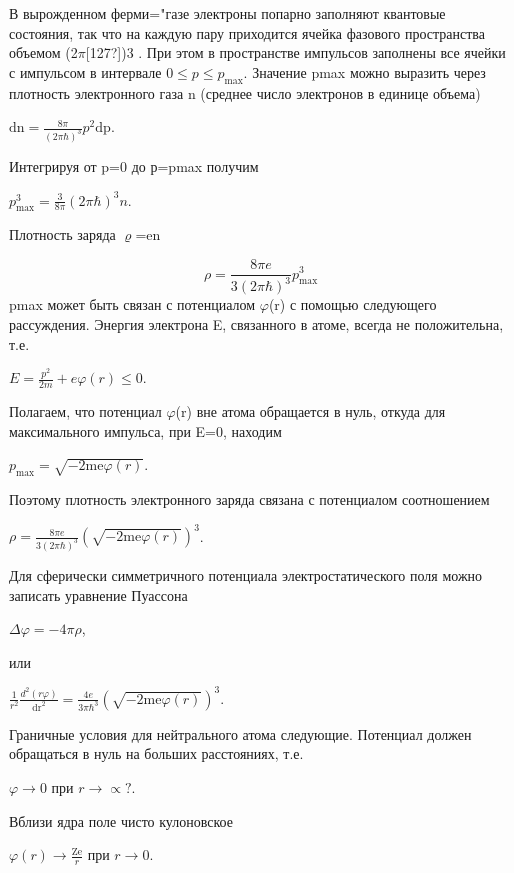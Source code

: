 \documentclass[a4paper,14pt, openany, twoside, draft]{extbook} %
\begin{document}
В вырожденном ферми="газе электроны попарно заполняют квантовые состояния, так что на каждую пару приходится ячейка фазового пространства объемом (2${\pi}$\textlatin{[127?]})3 . При этом в пространстве импульсов заполнены все ячейки с импульсом в интервале  $0\le p\le p_{\text{max}}$. Значение pmax можно выразить через плотность электронного газа n (среднее число электронов в единице объема)

 ${\text{dn}}=\frac{8\pi }{(2\pi \hbar )^3}p^2{\text{dp}}$.

Интегрируя от p=0 до р=pmax получим

 $p_{\text{max}}^3=\frac 3{8\pi }(2\pi \hbar )^3n$.

Плотность заряда ${\varrho}$=en

\begin{equation*}
\rho =\frac{8\mathit{\pi e}}{3(2\pi \hbar )^3}p_{\text{max}}^3
\end{equation*}
pmax может быть связан с потенциалом ${\varphi}$(r) с помощью следующего рассуждения. Энергия электрона E, связанного в атоме, всегда не положительна, т.е.

 $E=\frac{p^2}{2m}+\mathit{e\varphi }(r)\le 0$.

Полагаем, что потенциал ${\varphi}$(r) вне атома обращается в нуль, откуда для максимального импульса, при E=0, находим

 $p_{\text{max}}=\sqrt{-2{\text{me}}\varphi (r)}$.

Поэтому плотность электронного заряда связана с потенциалом соотношением

 $\rho =\frac{8\mathit{\pi e}}{3(2\pi \hbar )^3}\left(\sqrt{-2{\text{me}}\varphi (r)}\right)^3$.

Для сферически симметричного потенциала электростатического поля можно записать уравнение Пуассона

 $\Delta \varphi =-4\pi\rho$,

или

 $\frac 1{r^2}\frac{d^2(\mathit{r\varphi })}{{\text{dr}}^2}=\frac{4e}{3\pi \hbar ^3}\left(\sqrt{-2{\text{me}}\varphi (r)}\right)^3$.

Граничные условия для нейтрального атома следующие. Потенциал должен обращаться в нуль на больших расстояниях, т.е.

 $\varphi \rightarrow 0$ при  $r\rightarrow \propto ?$.

Вблизи ядра поле чисто кулоновское

 $\varphi (r)\rightarrow \frac{{\text{Ze}}} r$ при  $r\rightarrow 0$.
\end{document}
